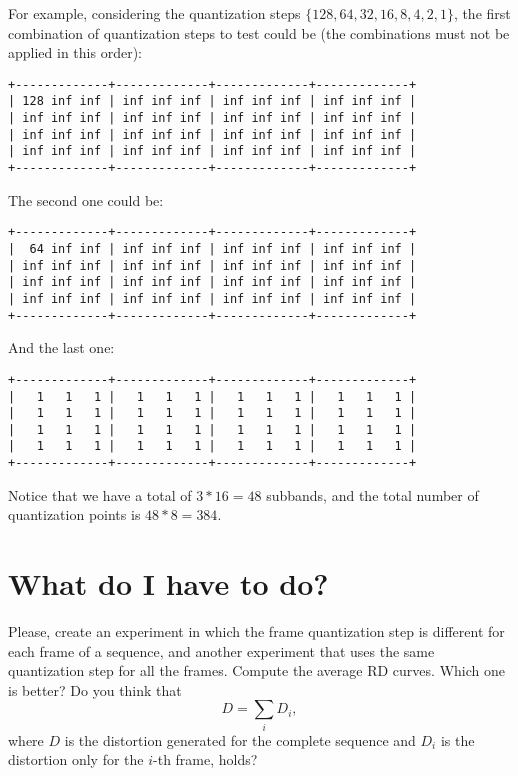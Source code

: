 \begin{enumerate}
  For example, considering the quantization steps $\{128, 64, 32, 16,
  8, 4, 2, 1\}$, the first combination of quantization steps to test
  could be (the combinations must not be applied in this order):
\begin{verbatim}
+-------------+-------------+-------------+-------------+
| 128 inf inf | inf inf inf | inf inf inf | inf inf inf |
| inf inf inf | inf inf inf | inf inf inf | inf inf inf | 
| inf inf inf | inf inf inf | inf inf inf | inf inf inf | 
| inf inf inf | inf inf inf | inf inf inf | inf inf inf | 
+-------------+-------------+-------------+-------------+
\end{verbatim}
  The second one could be:
\begin{verbatim}
+-------------+-------------+-------------+-------------+
|  64 inf inf | inf inf inf | inf inf inf | inf inf inf |
| inf inf inf | inf inf inf | inf inf inf | inf inf inf | 
| inf inf inf | inf inf inf | inf inf inf | inf inf inf | 
| inf inf inf | inf inf inf | inf inf inf | inf inf inf | 
+-------------+-------------+-------------+-------------+
\end{verbatim}
  And the last one:
\begin{verbatim}
+-------------+-------------+-------------+-------------+
|   1   1   1 |   1   1   1 |   1   1   1 |   1   1   1 |
|   1   1   1 |   1   1   1 |   1   1   1 |   1   1   1 | 
|   1   1   1 |   1   1   1 |   1   1   1 |   1   1   1 | 
|   1   1   1 |   1   1   1 |   1   1   1 |   1   1   1 | 
+-------------+-------------+-------------+-------------+
\end{verbatim}
\end{enumerate}

Notice that we have a total of $3*16=48$ subbands, and the total
number of quantization points is $48*8=384$.

\section{What do I have to do?}

Please, create an experiment in which the frame quantization step is
different for each frame of a sequence, and another experiment that
uses the same quantization step for all the frames. Compute the
average RD curves. Which one is better? Do you think that
\begin{equation*}
  D = \sum_i D_i,
\end{equation*}
where $D$ is the distortion generated for the complete sequence and
$D_i$ is the distortion only for the $i$-th frame, holds?

